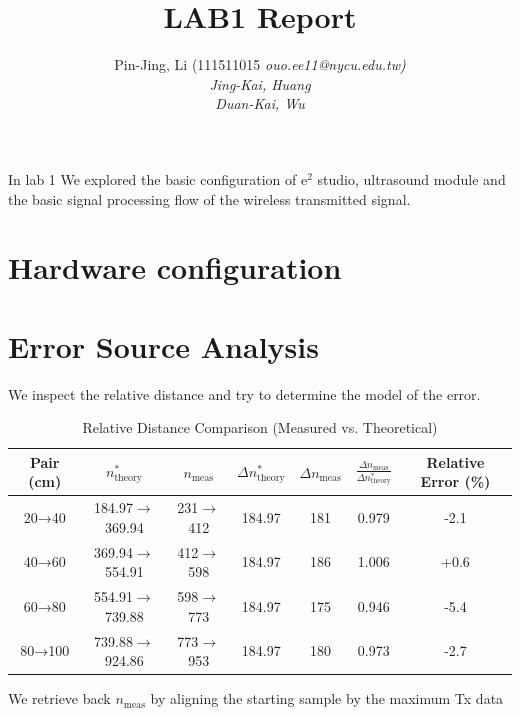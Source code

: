 \documentclass[10pt]{article}
\title{\vspace{-0.2em} \huge LAB1 Report}
\author{Pin-Jing, Li (111511015 \it{ouo.ee11@nycu.edu.tw})\\ 
Jing-Kai, Huang\\ 
Duan-Kai, Wu}
\begin{document}
\maketitle


In lab 1 We explored the basic configuration of $\mathrm{e}^2$ studio, ultrasound module and the basic signal processing flow of the wireless transmitted signal.



\section{Hardware configuration}


\section{Error Source Analysis}


We inspect the relative distance and try to determine the model of the error.

\begin{table}[h!]
\centering
\caption{Relative Distance Comparison (Measured vs. Theoretical)}
\begin{tabular}{|c|c|c|c|c|c|c|}
\hline
Pair (cm) & $n^*_{\mathrm{theory}}$ & $n_{\mathrm{meas}}$ & 
$\Delta n^*_{\mathrm{theory}}$ & $\Delta n_{\mathrm{meas}}$ &
$\frac{\Delta n_{\mathrm{meas}}}{\Delta n^*_{\mathrm{theory}}}$ & 
Relative Error (\%) \\
\hline
20→40 & 184.97$\rightarrow$369.94 & 231$\rightarrow$412 & 184.97 & 181 & 0.979 & -2.1 \\
40→60 & 369.94$\rightarrow$554.91 & 412$\rightarrow$598 & 184.97 & 186 & 1.006 & +0.6 \\
60→80 & 554.91$\rightarrow$739.88 & 598$\rightarrow$773 & 184.97 & 175 & 0.946 & -5.4 \\
80→100 & 739.88$\rightarrow$924.86 & 773$\rightarrow$953 & 184.97 & 180 & 0.973 & -2.7 \\
\hline
\end{tabular}
\end{table}

We retrieve back $n_\mathrm{meas}$ by aligning the starting sample by the maximum Tx data 
\end{document}
